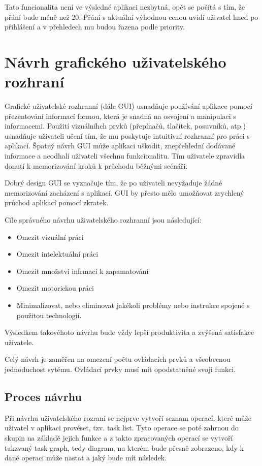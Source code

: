 Tato funcionalita není ve výsledné aplikaci nezbytná, opět se počítá s tím, že přání bude méně než 20. Přání s aktuální výhodnou cenou uvidí uživatel hned po přihlášení a v přehledech mu budou řazena podle priority.

\section{Návrh grafického uživatelského rozhraní}
Grafické uživatelské rozhranní (dále GUI) usnadňuje používání aplikace pomocí přezentování informací formou, která je snadná na osvojení a manipulaci s informacemi. Použití vizuálníhch prvků (přepínačů, tlačítek, posuvníků, atp.) usnadňuje uživateli učení tím, že mu poskytuje intuitivní rozhranní pro práci s aplikací. Špatný návrh GUI může aplikaci uškodit, znepřehlední dodávané informace a neodhalí uživateli všechnu funkcionalitu. Tím uživatele zpravidla donutí k memorizování kroků k průchodu běžnými scénáři\cite{toby2001expgui}.

Dobrý design GUI se vyznačuje tím, že po uživateli nevyžaduje žádné memorizování zacházení s aplikací. GUI by přesto mělo umožňovat zrychlený průchod aplikací pomocí zkratek\cite{toby2001expgui}.

Cíle správného návrhu uživatelského rozhranní jsou následující\cite{galitz2007essential}:
\begin{itemize}
\item Omezit vizuální práci
\item Omezit intelektuální práci
\item Omezit množství infrmací k zapamatování
\item Omezit motorickou práci
\item Minimalizovat, nebo eliminovat jakékoli problémy nebo instrukce spojené s použitou technologií.
\end{itemize}
Výsledkem takovéhoto návrhu bude vždy lepší produktivita a zvýšená satisfakce uživatele\cite{galitz2007essential}.

Celý návrh je zaměřen na omezení počtu ovládacích prvků a všeobecnou jednoduchost sytému. Ovládací prvky musí mít opodstatněné svoji funkci.

\subsection{Proces návrhu}
Při návrhu uživatelského rozraní se nejprve vytvoří seznam operací, které může uživatel v aplikaci provéset, tzv. task list. Tyto operace se poté zahrnou do skupin na základě jejich funkce a z takto zpracovaných operací se vytvoří takzvaný task graph, tedy diagram, na kterém bude přesně zobrazeno, kdy k dané operaci může nastat a jaký bude mít následek.

